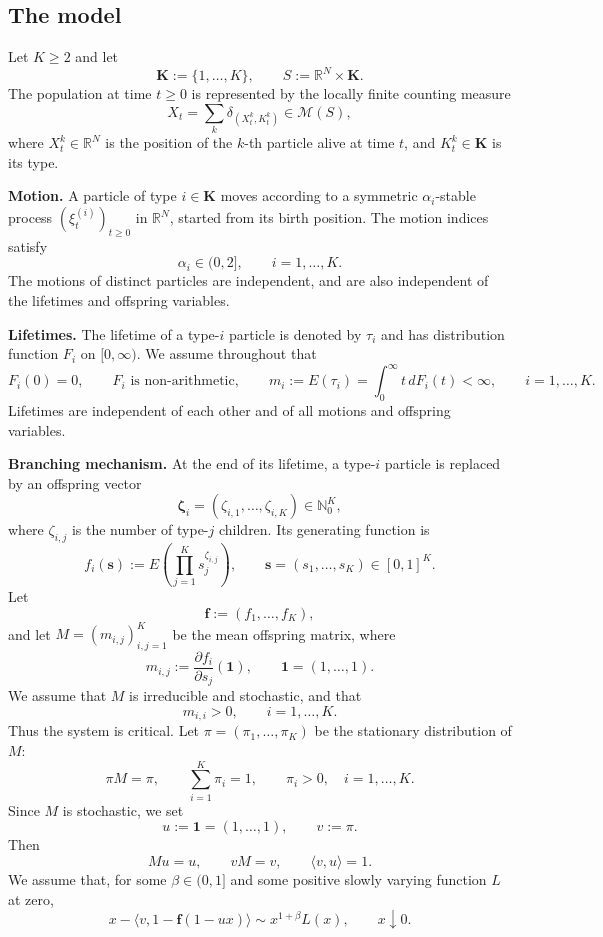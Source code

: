 \documentclass[reqno,final,11pt]{amsart}
\newcommand{\1}{\mathbbm{1}}
\theoremstyle{plain}
\theoremstyle{definition}
\theoremstyle{remark}
\begin{document}
\subsection{The model}\label{subsec:model}

Let \(K\ge2\) and let
\[
\mathbf K:=\{1,\dots,K\},
\qquad
S:=\mathbb R^N\times\mathbf K.
\]
The population at time \(t\ge0\) is represented by the locally finite counting measure
\[
X_t=\sum_k\delta_{(X_t^k,K_t^k)}\in\mathcal M(S),
\]
where \(X_t^k\in\mathbb R^N\) is the position of the \(k\)-th particle alive at time \(t\), and
\(K_t^k\in\mathbf K\) is its type.

\medskip

\noindent\textbf{Motion.}
A particle of type \(i\in\mathbf K\) moves according to a symmetric
\(\alpha_i\)-stable process \((\xi_t^{(i)})_{t\ge0}\) in \(\mathbb R^N\), started from its birth
position. The motion indices satisfy
\[
\alpha_i\in(0,2],
\qquad i=1,\dots,K.
\]
The motions of distinct particles are independent, and are also independent of the lifetimes and
offspring variables.

\medskip

\noindent\textbf{Lifetimes.}
The lifetime of a type-\(i\) particle is denoted by \(\tau_i\) and has distribution function
\(F_i\) on \([0,\infty)\). We assume throughout that
\[
F_i(0)=0,
\qquad
F_i \text{ is non-arithmetic},
\qquad
m_i:=E(\tau_i)=\int_0^\infty t\,dF_i(t)<\infty,
\qquad i=1,\dots,K.
\]
Lifetimes are independent of each other and of all motions and offspring variables.

\medskip

\noindent\textbf{Branching mechanism.}
At the end of its lifetime, a type-\(i\) particle is replaced by an offspring vector
\[
\boldsymbol\zeta_i=(\zeta_{i,1},\dots,\zeta_{i,K})\in\mathbb N_0^K,
\]
where \(\zeta_{i,j}\) is the number of type-\(j\) children. Its generating function is
\[
f_i(\mathbf s)
:=
E\left(\prod_{j=1}^K s_j^{\zeta_{i,j}}\right),
\qquad
\mathbf s=(s_1,\dots,s_K)\in[0,1]^K.
\]
Let
\[
\mathbf f:=(f_1,\dots,f_K),
\]
and let \(M=(m_{i,j})_{i,j=1}^K\) be the mean offspring matrix, where
\[
m_{i,j}
:=
\frac{\partial f_i}{\partial s_j}(\mathbf 1),
\qquad
\mathbf 1=(1,\dots,1).
\]
We assume that \(M\) is irreducible and stochastic, and that
\[
m_{i,i}>0,
\qquad i=1,\dots,K.
\]
Thus the system is critical. Let \(\pi=(\pi_1,\dots,\pi_K)\) be the stationary distribution of \(M\):
\[
\pi M=\pi,
\qquad
\sum_{i=1}^K\pi_i=1,
\qquad
\pi_i>0,\quad i=1,\dots,K.
\]
Since \(M\) is stochastic, we set
\[
u:=\mathbf 1=(1,\dots,1),
\qquad
v:=\pi.
\]
Then
\[
Mu=u,
\qquad
vM=v,
\qquad
\langle v,u\rangle=1.
\]
We assume that, for some \(\beta\in(0,1]\) and some positive slowly varying function \(L\) at zero,
\begin{equation*}
x-\langle v,1-\mathbf f(1-u x)\rangle
\sim
x^{1+\beta}L(x),
\qquad x\downarrow0.
\end{equation*}
\end{document}
